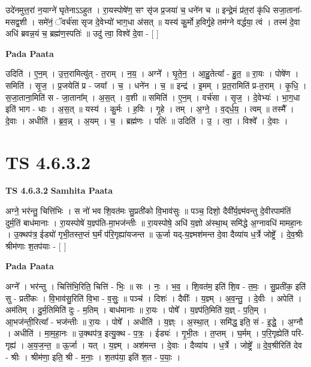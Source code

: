 \documentclass[17pt]{extarticle}
\begin{document}
उदे॑नमुत्त॒रां न॒याग्ने॑ घृतेनाऽऽहुत । रा॒यस्पोषे॑ण॒ सꣳ सृ॑ज प्र॒जया॑ च॒ धने॑न च ॥ इन्द्रे॒मं प्र॑त॒रां कृ॑धि सजा॒ताना॑-मसद्व॒शी । समे॑नं॒ ॅवर्च॑सा सृज दे॒वेभ्यो॑ भाग॒धा अ॑सत् ॥ यस्य॑ कु॒र्मो ह॒विर्गृ॒हे तम॑ग्ने वर्द्धया॒ त्वं । तस्म॑ दे॒वा अधि॑ ब्रवन्न॒यं च॒ ब्रह्म॑ण॒स्पतिः॑ ॥ उदु॑ त्वा॒ विश्वे॑ दे॒वा - [  ] \newline

\textbf{Pada Paata} \newline

उदिति॑ । ए॒न॒म् । उ॒त्त॒रामित्यु॑त् - त॒राम् । न॒य॒ । अग्ने᳚ । घृ॒ते॒न॒ । आ॒हु॒तेत्या᳚ - हु॒त॒ ॥ रा॒यः । पोषे॑ण । समिति॑ । सृ॒ज॒ । प्र॒जयेति॑ प्र - जया᳚ । च॒ । धने॑न । च॒ ॥ इन्द्र॑ । इ॒मम् । प्र॒त॒रामिति॑ प्र-त॒राम् । कृ॒धि॒ । स॒जा॒ताना॒मिति॑ स - जा॒ताना᳚म् । अ॒स॒त् । व॒शी ॥ समिति॑ । ए॒न॒म् । वर्च॑सा । सृ॒ज॒ । दे॒वेभ्यः॑ । भा॒ग॒धा इति॑ भाग - धाः । अ॒स॒त् ॥ यस्य॑ । कु॒र्मः । ह॒विः । गृ॒हे । तम् । अ॒ग्ने॒ । व॒द्‌र्ध॒य॒ । त्वम् ॥ तस्मै᳚ । दे॒वाः । अधीति॑ । ब्र॒व॒न्न् । अ॒यम् । च॒ । ब्रह्म॑णः । पतिः॑ ॥ उदिति॑ । उ॒ । त्वा॒ । विश्वे᳚ । दे॒वाः ।  \newline




\section*{ TS 4.6.3.2 }

\textbf{TS 4.6.3.2 } \newline
\textbf{Samhita Paata} \newline

अग्ने॒ भर॑न्तु॒ चित्ति॑भिः । स नो॑ भव शि॒वत॑मः सु॒प्रती॑को वि॒भाव॑सुः ॥ पञ्च॒ दिशो॒ दैवी᳚र्य॒ज्ञ्म॑वन्तु दे॒वीरपाम॑तिं दुर्म॒तिं बाध॑मानाः । रा॒यस्पोषे॑ य॒ज्ञ्प॑ति-मा॒भज॑न्तीः ॥ रा॒यस्पोषे॒ अधि॑ य॒ज्ञो अ॑स्था॒थ् समि॑द्धे अ॒ग्नावधि॑ मामहा॒नः । उ॒क्थप॑त्र॒ ईड्यो॑ गृभी॒तस्त॒प्तं घ॒र्मं प॑रि॒गृह्या॑यजन्त ॥ ऊ॒र्जा यद्-य॒ज्ञ्मश॑मन्त दे॒वा दैव्या॑य ध॒र्त्रे जोष्ट्रे᳚ । दे॒व॒श्रीः श्रीम॑णाः श॒तप॑याः - [  ] \newline

\textbf{Pada Paata} \newline

अग्ने᳚ । भर॑न्तु । चित्ति॑भि॒रिति॒ चित्ति॑ - भिः॒ ॥ सः । नः॒ । भ॒व॒ । शि॒वत॑म॒ इति॑ शि॒व - त॒मः॒ । सु॒प्रती॑क॒ इति॑ सु - प्रती॑कः । वि॒भाव॑सु॒रिति॑ वि॒भा - व॒सुः॒ ॥ पञ्च॑ । दिशः॑ । दैवीः᳚ । य॒ज्ञ्म् । अ॒व॒न्तु॒ । दे॒वीः । अपेति॑ । अम॑तिम् । दु॒र्म॒तिमिति॑ दुः - म॒तिम् । बाध॑मानाः ॥ रा॒यः । पोषे᳚ । य॒ज्ञ्प॑ति॒मिति॑ य॒ज्ञ् - प॒ति॒म् । आ॒भज॑न्ती॒रित्या᳚ - भज॑न्तीः ॥ रा॒यः । पोषे᳚ । अधीति॑ । य॒ज्ञ्ः । अ॒स्था॒त् । समि॑द्ध॒ इति॒ सं - इ॒द्धे॒ । अ॒ग्नौ । अधीति॑ । मा॒म॒हा॒नः ॥ उ॒क्थप॑त्र॒ इत्यु॒क्थ - प॒त्रः॒ । ईड्यः॑ । गृ॒भी॒तः । त॒प्तम् । घ॒र्मम् । प॒रि॒गृह्येति॑ परि-गृह्य॑ । अ॒य॒ज॒न्त॒ ॥ ऊ॒र्जा । यत् । य॒ज्ञ्म् । अश॑मन्त । दे॒वाः । दैव्या॑य । ध॒र्त्रे । जोष्ट्रे᳚ ॥ दे॒व॒श्रीरिति॑ देव - श्रीः । श्रीम॑णा॒ इति॒ श्री - म॒नाः॒ । श॒तप॑या॒ इति॑ श॒त - प॒याः॒ ।  \newline
\end{document}
